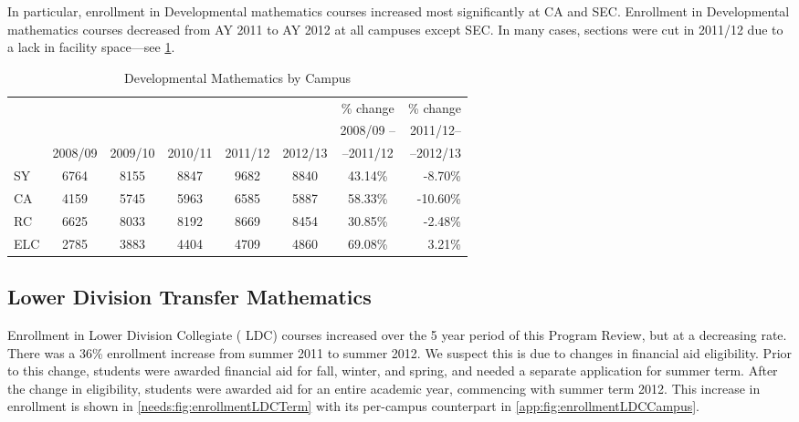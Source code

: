 In particular, enrollment in Developmental mathematics courses increased most
significantly at CA and SEC. Enrollment in Developmental mathematics courses
decreased from AY 2011 to AY 2012 at all campuses except SEC. In many cases,
sections were cut in 2011/12 due to a lack in facility space---see
\cref{needs:tab:enrollmentDevelp}. 


\begin{table}[!htb]
	\caption{Developmental Mathematics by Campus}
	\label{needs:tab:enrollmentDevelp}
	\begin{tabular}{l*{6}{c}r}
		\toprule
		    &        &        &        &        &        & \% change & \% change \\
		    &		&	&	&	&	&2008/09 --	&2011/12--\\
		    & 2008/09 & 2009/10 & 2010/11 & 2011/12 & 2012/13 & --2011/12 &--2012/13 \\
		\midrule
		SY  & 6764   & 8155   & 8847   & 9682   & 8840   & 43.14\%   & -8.70\%   \\
		CA  & 4159   & 5745   & 5963   & 6585   & 5887   & 58.33\%   & -10.60\%  \\
		RC  & 6625   & 8033   & 8192   & 8669   & 8454   & 30.85\%   & -2.48\%   \\
		ELC & 2785   & 3883   & 4404   & 4709   & 4860   & 69.08\%   & 3.21\%    \\
		\bottomrule
	\end{tabular}
\end{table}

\subsection{Lower Division Transfer Mathematics}
Enrollment in Lower Division Collegiate ( LDC) courses increased over the 5
year period of this Program Review, but at a decreasing rate. There was a 36\%
enrollment increase from summer 2011 to summer 2012. We suspect this is due to
changes in financial aid eligibility. Prior to this change, students were
awarded financial aid for fall, winter, and spring, and needed a separate
application for summer term.  After the change in eligibility, students were
awarded aid for an entire academic year, commencing with summer term 2012.
This increase in enrollment is shown in \cref{needs:fig:enrollmentLDCTerm} with
its per-campus counterpart in \vref{app:fig:enrollmentLDCCampus}.

